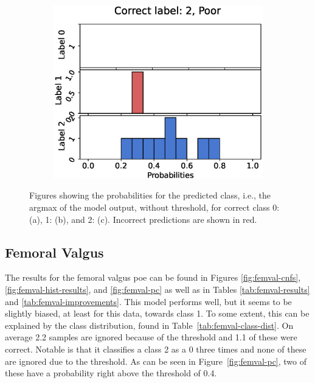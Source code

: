 \begin{figure}
  \begin{subfigure}[t]{0.33\textwidth}
    \includegraphics[width=\textwidth]{files/figs/res/pelvis/pc2-rb.eps}
    \caption{}
    \label{fig:pelvis-pc2}
  \end{subfigure}

  \caption{Figures showing the probabilities for the predicted class, i.e., the argmax of the model output, without threshold, for correct class 0: (a), 1: (b), and 2: (c). Incorrect predictions are shown in red.}
  \label{fig:pelvis-pc}
\end{figure}


\FloatBarrier
\subsection{Femoral Valgus}
The results for the femoral valgus \gls{poe} can be found in Figures \ref{fig:femval-cnfs}, \ref{fig:femval-hist-results}, and \ref{fig:femval-pc} as well as in Tables \ref{tab:femval-results} and \ref{tab:femval-improvements}.
This model performs well, but it seems to be slightly biased, at least for this data, towards class 1. To some extent, this can be explained by the class distribution, found in Table~\ref{tab:femval-class-dist}. On average 2.2 samples are ignored because of the threshold and 1.1 of these were correct. Notable is that it classifies a class 2 as a 0 three times and none of these are ignored due to the threshold. As can be seen in Figure~\ref{fig:femval-pc}, two of these have a probability right above the threshold of 0.4.

